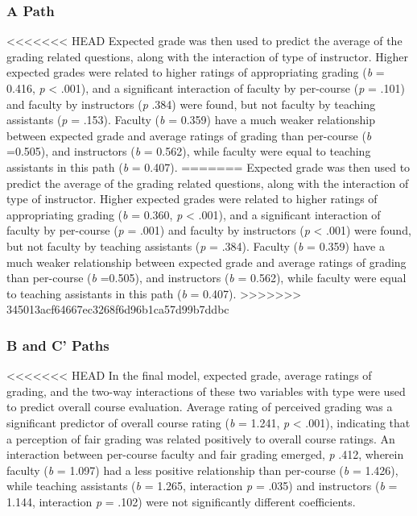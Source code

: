 \documentclass[man]{apa6}
\theoremstyle{definition}
\theoremstyle{definition}
\theoremstyle{definition}
\theoremstyle{remark}
\begin{document}
\subsubsection{A Path}\label{a-path}

<<<<<<< HEAD
Expected grade was then used to predict the average of the grading
related questions, along with the interaction of type of instructor.
Higher expected grades were related to higher ratings of appropriating
grading (\emph{b} = 0.416, \emph{p} \textless{} .001), and a significant
interaction of faculty by per-course (\emph{p} = .101) and faculty by
instructors (\emph{p} .384) were found, but not faculty by teaching
assistants (\emph{p} = .153). Faculty (\emph{b} = 0.359) have a much
weaker relationship between expected grade and average ratings of
grading than per-course (\emph{b} =0.505), and instructors (\emph{b} =
0.562), while faculty were equal to teaching assistants in this path
(\emph{b} = 0.407).
=======
Expected grade was then used to predict the average of the grading related questions, along with the interaction of type of instructor. Higher expected grades were related to higher ratings of appropriating grading (\emph{b} = 0.360, \emph{p} \textless{} .001), and a significant interaction of faculty by per-course (\emph{p} = .001) and faculty by instructors (\emph{p} \textless{} .001) were found, but not faculty by teaching assistants (\emph{p} = .384). Faculty (\emph{b} = 0.359) have a much weaker relationship between expected grade and average ratings of grading than per-course (\emph{b} =0.505), and instructors (\emph{b} = 0.562), while faculty were equal to teaching assistants in this path (\emph{b} = 0.407).
>>>>>>> 345013acf64667ec3268f6d96b1ca57d99b7ddbc

\subsubsection{B and C' Paths}\label{b-and-c-paths}

<<<<<<< HEAD
In the final model, expected grade, average ratings of grading, and the
two-way interactions of these two variables with type were used to
predict overall course evaluation. Average rating of perceived grading
was a significant predictor of overall course rating (\emph{b} = 1.241,
\emph{p} \textless{} .001), indicating that a perception of fair grading
was related positively to overall course ratings. An interaction between
per-course faculty and fair grading emerged, \emph{p} .412, wherein
faculty (\emph{b} = 1.097) had a less positive relationship than
per-course (\emph{b} = 1.426), while teaching assistants (\emph{b} =
1.265, interaction \emph{p} = .035) and instructors (\emph{b} = 1.144,
interaction \emph{p} = .102) were not significantly different
coefficients.
\end{document}

